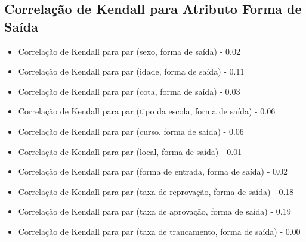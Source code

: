 \subsection{Correlação de Kendall para Atributo Forma de Saída}
\begin{itemize}
    \item Correlação de Kendall para par (sexo, forma de saída) - 0.02
    \item Correlação de Kendall para par (idade, forma de saída) - 0.11
    \item Correlação de Kendall para par (cota, forma de saída) - 0.03
    \item Correlação de Kendall para par (tipo da escola, forma de saída) - 0.06
    \item Correlação de Kendall para par (curso, forma de saída) - 0.06
    \item Correlação de Kendall para par (local, forma de saída) - 0.01
    \item Correlação de Kendall para par (forma de entrada, forma de saída) - 0.02
    \item Correlação de Kendall para par (taxa de reprovação, forma de saída) - 0.18
    \item Correlação de Kendall para par (taxa de aprovação, forma de saída) - 0.19
    \item Correlação de Kendall para par (taxa de trancamento, forma de saída) - 0.00
\end{itemize}

